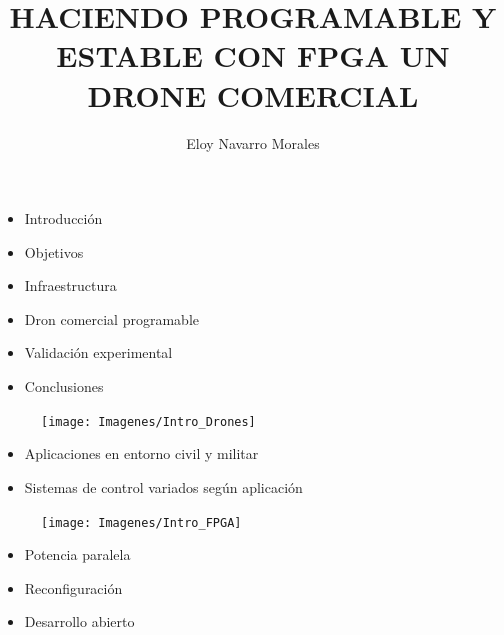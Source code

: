 \documentclass[a4,landscpae]{seminar}
\title{HACIENDO PROGRAMABLE Y ESTABLE CON FPGA UN DRONE COMERCIAL}
\author{Eloy Navarro Morales}
\begin{document}
\maketitle

\begin{hslide}
\begin{itemize}
	\item Introducci\'on
	\item Objetivos
	\item Infraestructura
	\item Dron comercial programable
	\item Validaci\'on experimental
	\item Conclusiones
\end{itemize}
\end{hslide}



\begin{hslide}
\begin{minipage}{6.1cm}
	\begin{figure}
		\texttt{[image: Imagenes/Intro\_Drones]}
	\end{figure}
\end{minipage} \hfill
\begin{minipage}{4.9cm}
	\begin{itemize}
		\item Aplicaciones en entorno civil y militar
		\item Sistemas de control variados seg\'un aplicaci\'on
	\end{itemize}
\end{minipage}

\end{hslide}
\begin{hslide}
\begin{minipage}{7cm}
	\begin{center}
		\begin{figure}
			\texttt{[image: Imagenes/Intro\_FPGA]}
		\end{figure}
	\end{center}
\end{minipage} \hfill
\begin{minipage}{3.5cm}
	\begin{itemize}
		\item Potencia paralela
		\item Reconfiguraci\'on
		\item Desarrollo abierto
	\end{itemize}
\end{minipage}
\end{hslide}
\end{document}
